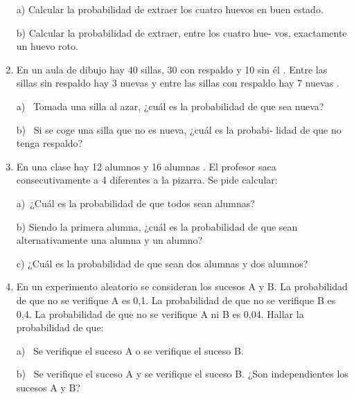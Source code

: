 \begin{adjustwidth}{5mm}{5mm}
\begin{enumerate}[PB. 1. ]
a) Calcular la probabilidad de extraer los cuatro huevos en buen estado.
 
b) Calcular la probabilidad de extraer, entre los cuatro hue- vos, exactamente un huevo roto. 

\hspace{-1cm}\vspace{1cm}


\item En un aula de dibujo hay 40 sillas, 30 con respaldo y 10 sin él . Entre las sillas sin respaldo hay 3 nuevas y entre las sillas con respaldo hay 7 nuevas . 

a)  Tomada una silla al azar, ¿cuál es la probabilidad de que sea nueva? 

b)  Si se coge una silla que no es nueva, ¿cuál es la probabi- lidad de que no tenga respaldo? 

\hspace{-1cm}\vspace{1cm}


\item En una clase hay 12 alumnos y 16 alumnas . El profesor saca consecutivamente a 4 diferentes a la pizarra. Se pide calcular: 

a) ¿Cuál es la probabilidad de que todos sean alumnas? 

b) Siendo la primera alumna, ¿cuál es la probabilidad de que sean alternativamente una alumna y un alumno? 

c) ¿Cuál es la probabilidad de que sean dos alumnas y dos alumnos? 

\hspace{-1cm}\vspace{1cm}


\item En un experimento aleatorio se consideran los sucesos A y B. La probabilidad de que no se verifique A es 0,1. La probabilidad de que no se verifique B es 0,4. La probabilidad de que no se verifique A ni B es 0,04. Hallar la probabilidad de que: 

a)  Se verifique el suceso A o se verifique el suceso B. 

b)  Se verifique el suceso A y se verifique el suceso B. ¿Son independientes los sucesos A y B? 

\hspace{-1cm}\vspace{1cm}


\end{enumerate}
\end{adjustwidth}
